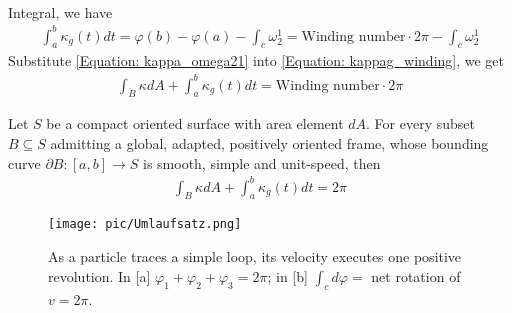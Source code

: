 \documentclass[10pt]{article}
\begin{document}
\begin{lemma}
\begin{equation*}
\begin{aligned}
                    \end{aligned}
                \end{equation*}
                Integral, we have
                \begin{equation}
                    \label{Equation: kappag_winding}
                    \begin{aligned}
                        \int_a^b\kappa_g(t)dt = \varphi(b) - \varphi(a) - \int_c\omega_2^1 = \text{Winding number}\cdot 2\pi - \int_c\omega_2^1
                    \end{aligned}
                \end{equation}
                Substitute \eqref{Equation: kappa_omega21} into \eqref{Equation: kappag_winding}, we get
                \begin{equation*}
                    \begin{aligned}
                        \int_B\kappa dA + \int_a^b\kappa_g(t)dt = \text{Winding number}\cdot 2\pi
                    \end{aligned}
                \end{equation*}
            \end{lemma}

            \begin{theorem}
                Let $S$ be a compact oriented surface with area element $dA$. For every subset $B\subseteq S$ admitting a global, adapted, positively oriented frame, whose bounding curve $\partial B:[a,b]\rightarrow S$ is smooth, simple and unit-speed, then
                \begin{equation*}
                    \begin{aligned}
                        \int_B\kappa dA + \int_a^b\kappa_g(t)dt = 2\pi
                    \end{aligned}
                \end{equation*}
            \end{theorem}
            
            \begin{figure}[H]
                \centering
                \texttt{[image: pic/Umlaufsatz.png]}
                \caption{As a particle traces a simple loop, its velocity executes one positive revolution. In [a] $\varphi_1 + \varphi_2 + \varphi_3 = 2\pi$; in [b] $\int_cd\varphi = $ net rotation of $v = 2\pi$.}
            \end{figure}
            
\end{document}
